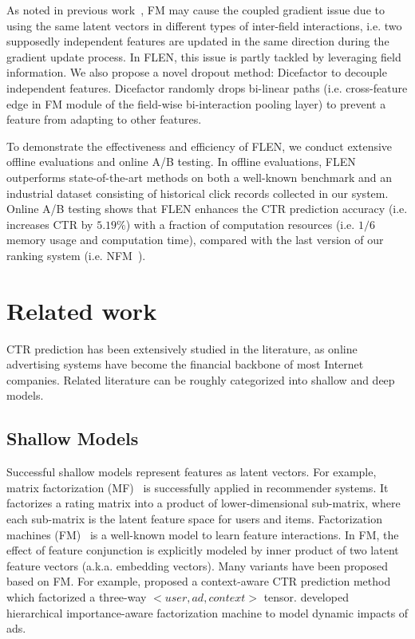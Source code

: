 \documentclass[sigconf]{acmart}
\begin{document}
As noted in previous work~\citep{qu2018product}, FM may cause the coupled gradient issue due to using the same latent vectors in different types of inter-field interactions, i.e. two supposedly independent features are updated in the same direction during the gradient update process.  
In FLEN, this issue is partly tackled by leveraging field information. 
We also propose a novel dropout method: Dicefactor to decouple independent features. 
Dicefactor randomly drops bi-linear paths (i.e. cross-feature edge in FM module of the field-wise bi-interaction pooling layer) to prevent a feature from adapting to other features. 
 
To demonstrate the effectiveness and efficiency of FLEN, we conduct extensive offline evaluations and online A/B testing. 
In offline evaluations, FLEN outperforms state-of-the-art methods on both a well-known benchmark and an industrial dataset consisting of historical click records collected in our system. 
Online A/B testing shows that FLEN enhances the CTR prediction accuracy (i.e. increases CTR by $5.19\%$) with a fraction of computation resources (i.e. $1/6$ memory usage and computation time), compared with the last version of our ranking system (i.e. NFM~\citep{he2017neural}). 

\section{Related work}
CTR prediction has been extensively studied in the literature, as online advertising systems have become the financial backbone of most Internet companies. 
Related literature can be roughly categorized into shallow and deep models. 

\subsection{Shallow Models}
Successful shallow models represent features as latent vectors. 
For example, matrix factorization (MF)~\citep{Koren2009Matrix} is successfully applied in recommender systems. It factorizes a rating matrix into a product of lower-dimensional sub-matrix, where each sub-matrix is the latent feature space for users and items. 
Factorization machines (FM)~\citep{rendle2010factorization} is a well-known model to learn feature interactions. In FM, the effect of feature conjunction is  explicitly modeled by inner product of two latent feature vectors (a.k.a. embedding vectors).
Many variants have been proposed based on FM. 
For example, \citet{rendle2011fast} proposed a context-aware CTR prediction method which factorized a three-way $<user, ad, context>$ tensor. \citet{oentaryo2014predicting} developed hierarchical importance-aware factorization machine to model dynamic impacts of ads. 
\end{document}
